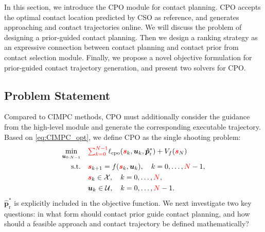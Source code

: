 In this section, we introduce the CPO module for contact planning. CPO accepts the optimal contact location predicted by CSO as reference, and generates approaching and contact trajectories online. We will discuss the problem of designing a prior-guided contact planning. Then we design a ranking strategy as an expressive connection between contact planning and contact prior from contact selection module. Finally, we propose a novel objective formulation for prior-guided contact trajectory generation, and present two solvers for CPO.

\subsection{Problem Statement}

Compared to CIMPC methods, CPO must additionally consider the guidance from the high-level module and generate the corresponding executable trajectory. Based on \eqref{eq:CIMPC_opt}, we define CPO as the single shooting problem:
\begin{equation}
 \begin{aligned}
\min_{\boldsymbol{u}_{0:N-1}} \quad &
 {\textstyle \textcolor{red}{\sum_{k=0}^{N-1}}} \ell_{\text{cpo}}(\text{}\textcolor{red}{\boldsymbol{s}}_k, \boldsymbol{u}_k, \boldsymbol{\hat{p}}^*_{\text{r}}) + V_f(\text{}\textcolor{red}{\boldsymbol{s}}_N) \\
\text{s.t.}\quad & \text{}\textcolor{red}{\boldsymbol{s}}_{k+1} = f(\text{}\textcolor{red}{\boldsymbol{s}}_k, \boldsymbol{u}_k), \quad k=0,\dots,\textcolor{red}{N}-1, \\
& \text{}\textcolor{red}{\boldsymbol{s}}_k \in \mathcal{X}, \quad k=0,\dots,\textcolor{red}{N}, \\
& \boldsymbol{u}_k \in \mathcal{U}, \quad k=0,\dots,\textcolor{red}{N}-1.
\end{aligned}\label{equ:origin_cpo_problem}
\end{equation}
\noindent{} $\boldsymbol{\hat{p}}^*_{\text{r}}$ is explicitly included in the objective function. We next investigate two key questions: in what form should contact prior guide contact planning, and how should a feasible approach and contact trajectory be defined mathematically?
